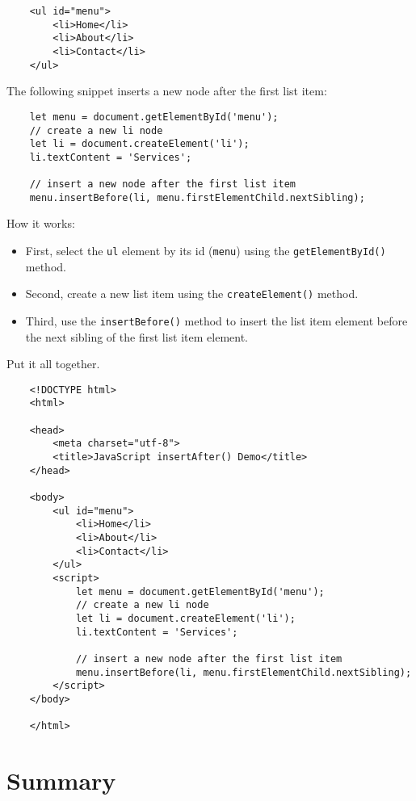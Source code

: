 \documentclass[11pt]{article}
\begin{document}
\begin{lstlisting}
    <ul id="menu">
        <li>Home</li>   
        <li>About</li>
        <li>Contact</li>
    </ul>
\end{lstlisting}

\noindent
The following snippet inserts a new node after the first list item:

\begin{lstlisting}
    let menu = document.getElementById('menu');
    // create a new li node
    let li = document.createElement('li');
    li.textContent = 'Services';

    // insert a new node after the first list item
    menu.insertBefore(li, menu.firstElementChild.nextSibling);
\end{lstlisting}

\noindent
How it works:

\begin{itemize}
\item First, select the \verb|ul| element by its id (\verb|menu|) using
the \verb|getElementById()| method.
\item Second, create a new list item using the \verb|createElement()| method.
\item Third, use the \verb|insertBefore()| method to insert the list item element
before the next sibling of the first list item element.
\end{itemize}

Put it all together.

\begin{lstlisting}
    <!DOCTYPE html>
    <html>

    <head>
        <meta charset="utf-8">
        <title>JavaScript insertAfter() Demo</title>
    </head>

    <body>
        <ul id="menu">
            <li>Home</li>
            <li>About</li>
            <li>Contact</li>
        </ul>
        <script>
            let menu = document.getElementById('menu');
            // create a new li node
            let li = document.createElement('li');
            li.textContent = 'Services';

            // insert a new node after the first list item
            menu.insertBefore(li, menu.firstElementChild.nextSibling);
        </script>
    </body>

    </html>
\end{lstlisting}

\section*{Summary}
\end{document}
